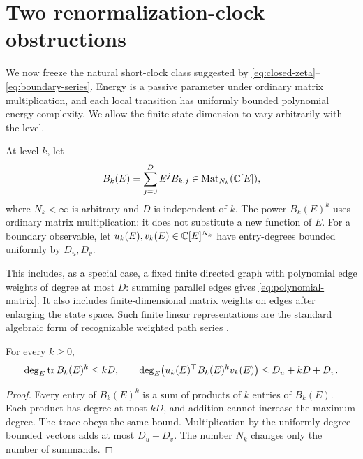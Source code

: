 \section{Two renormalization-clock obstructions}

We now freeze the natural short-clock class suggested by
\eqref{eq:closed-zeta}--\eqref{eq:boundary-series}.  Energy is a passive
parameter under ordinary matrix multiplication, and each local transition
has uniformly bounded polynomial energy complexity.  We allow the finite
state dimension to vary arbitrarily with the level.

\begin{definition}
At level \(k\), let
\begin{equation}
B_k(E)=\sum_{j=0}^{D}E^jB_{k,j}
\in\operatorname{Mat}_{N_k}(\mathbb C[E]),
\label{eq:polynomial-matrix}
\end{equation}
where \(N_k<\infty\) is arbitrary and \(D\) is independent of \(k\).  The
power \(B_k(E)^k\) uses ordinary matrix multiplication: it does not substitute
a new function of \(E\).  For a boundary observable, let
\(u_k(E),v_k(E)\in\mathbb C[E]^{N_k}\) have entry-degrees bounded uniformly by
\(D_u,D_v\).
\end{definition}

This includes, as a special case, a fixed finite directed graph with
polynomial edge weights of degree at most \(D\): summing parallel edges gives
\eqref{eq:polynomial-matrix}.  It also includes finite-dimensional matrix
weights on edges after enlarging the state space.  Such finite linear
representations are the standard algebraic form of recognizable weighted
path series \citep{schutzenberger1961}.

\begin{theorem}
For every \(k\ge0\),
\begin{equation}
\deg_E\operatorname{tr} B_k(E)^k\le kD,
\qquad
\deg_E\bigl(u_k(E)^\top B_k(E)^kv_k(E)\bigr)
\le D_u+kD+D_v.
\label{eq:linear-degree}
\end{equation}
\end{theorem}

\begin{proof}
Every entry of \(B_k(E)^k\) is a sum of products of \(k\) entries of
\(B_k(E)\).  Each product has degree at most \(kD\), and addition cannot
increase the maximum degree.  The trace obeys the same bound.  Multiplication
by the uniformly degree-bounded vectors adds at most \(D_u+D_v\).
The number \(N_k\) changes only the number of summands.
\end{proof}

